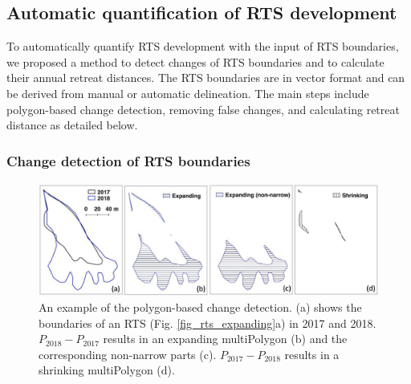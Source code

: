 \documentclass[authoryear,preprint,review,12pt]{elsarticle}
\begin{document}
\subsection{Automatic quantification of RTS development}
\label{sec_auto_rts_develop}

To automatically quantify RTS development with the input of RTS boundaries, we proposed a method to detect changes of RTS boundaries and to calculate their annual retreat distances.
The RTS boundaries are in vector format and can be derived from manual or automatic delineation. 
The main steps include polygon-based change detection, removing false changes, and calculating retreat distance as detailed below. 

\subsubsection{Change detection of RTS boundaries}
\label{sec_polygon_change_det}

\begin{figure} 
	\centering
	\includegraphics[width=14cm]{figs/rts_polygon_change_det_trim.jpg}
	\caption{An example of the polygon-based change detection. (a) shows the boundaries of an RTS (Fig. \ref{fig_rts_expanding}a) in 2017 and 2018. $P_{2018}-P_{2017}$ results in an expanding multiPolygon (b) and the corresponding non-narrow parts (c). $P_{2017}-P_{2018}$ results in a shrinking multiPolygon (d).}
	\label{fig_rts_change_det}
\end{figure}
\end{document}
